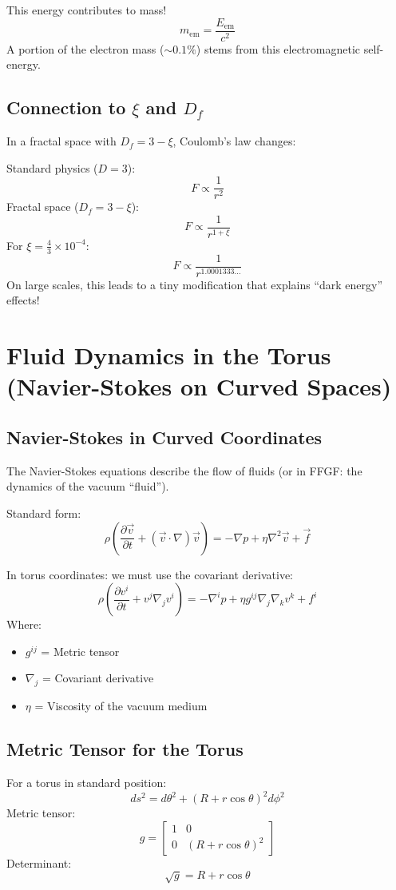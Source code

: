 This energy contributes to mass!
\[
m_{\text{em}} = \frac{E_{\text{em}}}{c^2}
\]
A portion of the electron mass (\( \sim 0.1\% \)) stems from this electromagnetic self-energy.

\subsection{Connection to \( \xi \) and \( D_f \)}
In a fractal space with \( D_f = 3 - \xi \), Coulomb's law changes:

Standard physics (\( D = 3 \)):
\[
F \propto \frac{1}{r^2}
\]
Fractal space (\( D_f = 3 - \xi \)):
\[
F \propto \frac{1}{r^{1 + \xi}}
\]
For \( \xi = \frac{4}{3} \times 10^{-4} \):
\[
F \propto \frac{1}{r^{1.0001333\ldots}}
\]
On large scales, this leads to a tiny modification that explains ``dark energy'' effects!

\section{Fluid Dynamics in the Torus (Navier-Stokes on Curved Spaces)}
\subsection{Navier-Stokes in Curved Coordinates}
The Navier-Stokes equations describe the flow of fluids (or in FFGF: the dynamics of the vacuum ``fluid'').

Standard form:
\[
\rho\left(\frac{\partial \vec{v}}{\partial t} + (\vec{v} \cdot \nabla) \vec{v}\right) = -\nabla p + \eta \nabla^2 \vec{v} + \vec{f}
\]

In torus coordinates: we must use the covariant derivative:
\[
\rho\left(\frac{\partial v^i}{\partial t} + v^j \nabla_j v^i\right) = -\nabla^i p + \eta g^{ij} \nabla_j \nabla_k v^k + f^i
\]
Where:
\begin{itemize}
	\item \( g^{ij} \) = Metric tensor
	\item \( \nabla_j \) = Covariant derivative
	\item \( \eta \) = Viscosity of the vacuum medium
\end{itemize}

\subsection{Metric Tensor for the Torus}
For a torus in standard position:
\[
ds^2 = d\theta^2 + (R + r \cos \theta)^2 d\phi^2
\]
Metric tensor:
\[
g = \begin{bmatrix}
	1 & 0 \\
	0 & (R + r \cos \theta)^2
\end{bmatrix}
\]
Determinant:
\[
\sqrt{g} = R + r \cos \theta
\]

